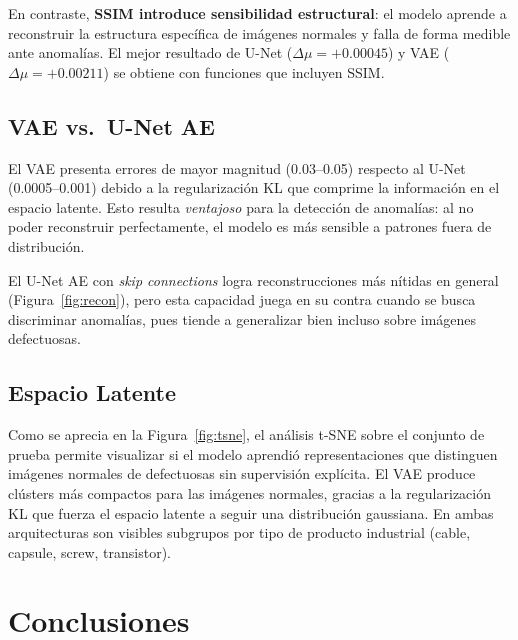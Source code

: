 \documentclass[conference]{IEEEtran}
\begin{document}
En contraste, \textbf{SSIM introduce sensibilidad estructural}: el modelo
aprende a reconstruir la estructura espec\'ifica de im\'agenes normales
y falla de forma medible ante anomal\'ias.
El mejor resultado de U-Net ($\Delta\mu = +0.00045$) y VAE
($\Delta\mu = +0.00211$) se obtiene con funciones que incluyen SSIM.

\subsection{VAE vs.\ U-Net AE}

El VAE presenta errores de mayor magnitud (0.03--0.05) respecto al
U-Net (0.0005--0.001) debido a la regularizaci\'on KL que comprime la
informaci\'on en el espacio latente.
Esto resulta \textit{ventajoso} para la detecci\'on de anomal\'ias:
al no poder reconstruir perfectamente, el modelo es m\'as sensible a
patrones fuera de distribuci\'on.

El U-Net AE con \textit{skip connections} logra reconstrucciones m\'as
n\'itidas en general (Figura~\ref{fig:recon}), pero esta capacidad juega
en su contra cuando se busca discriminar anomal\'ias, pues tiende a
generalizar bien incluso sobre im\'agenes defectuosas.

\subsection{Espacio Latente}

Como se aprecia en la Figura~\ref{fig:tsne}, el an\'alisis t-SNE sobre
el conjunto de prueba permite visualizar si el modelo aprendi\'o
representaciones que distinguen im\'agenes normales de defectuosas sin
supervisi\'on expl\'icita.
El VAE produce cl\'usters m\'as compactos para las im\'agenes normales,
gracias a la regularizaci\'on KL que fuerza el espacio latente a seguir
una distribuci\'on gaussiana.
En ambas arquitecturas son visibles subgrupos por tipo de producto
industrial (cable, capsule, screw, transistor).

\section{Conclusiones}
\end{document}
